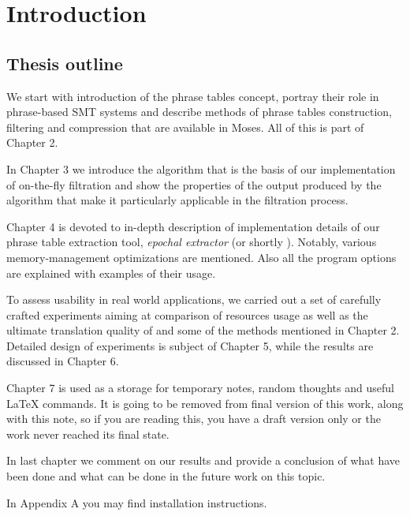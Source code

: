 \chapter{Introduction}
\label{chap:introduction}

\section{Thesis outline}

We start with introduction of the phrase tables concept,
portray their role in phrase-based SMT systems and describe
methods of phrase tables construction, filtering and compression that
are available in Moses. All of this is part of Chapter 2.

In Chapter 3 we introduce the algorithm that is the basis of our implementation
of on-the-fly filtration and show the properties of the output produced
by the algorithm that make it particularly applicable in the filtration process.

Chapter 4 is devoted to in-depth description of implementation details of our
phrase table extraction tool, \emph{epochal extractor} (or shortly \eppex{}).
Notably, various memory-management optimizations are mentioned.
Also all the program options are explained with examples of their usage.

To assess \eppex{} usability in real world applications, we carried out a set
of carefully crafted experiments aiming at comparison of resources usage as well as
the ultimate translation quality of \eppex{} and some of the methods mentioned
in Chapter 2.
Detailed design of experiments is subject of Chapter 5,
while the results are discussed in Chapter 6.

Chapter 7 is used as a storage for temporary notes, random thoughts and
useful LaTeX commands. It is going to be removed from final version
of this work, along with this note, so if you are reading this, you have
a draft version only or the work never reached its final state.

In last chapter we comment on our results and provide a conclusion of
what have been done and what can be done in the future work on this topic.

In Appendix A you may find \eppex{} installation instructions.
